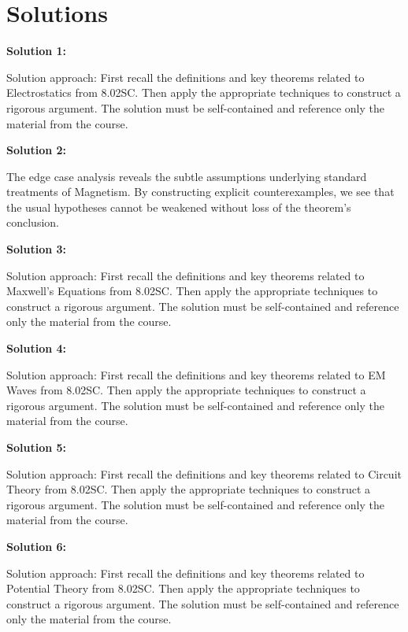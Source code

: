 \documentclass[12pt,a4paper]{exam}
\begin{document}
\newpage
\section*{Solutions}

\textbf{Solution 1:}

Solution approach: First recall the definitions and key theorems related to Electrostatics from 8.02SC. Then apply the appropriate techniques to construct a rigorous argument. The solution must be self-contained and reference only the material from the course.

\vspace{0.5cm}

\textbf{Solution 2:}

The edge case analysis reveals the subtle assumptions underlying standard treatments of Magnetism. By constructing explicit counterexamples, we see that the usual hypotheses cannot be weakened without loss of the theorem's conclusion.

\vspace{0.5cm}

\textbf{Solution 3:}

Solution approach: First recall the definitions and key theorems related to Maxwell's Equations from 8.02SC. Then apply the appropriate techniques to construct a rigorous argument. The solution must be self-contained and reference only the material from the course.

\vspace{0.5cm}

\textbf{Solution 4:}

Solution approach: First recall the definitions and key theorems related to EM Waves from 8.02SC. Then apply the appropriate techniques to construct a rigorous argument. The solution must be self-contained and reference only the material from the course.

\vspace{0.5cm}

\textbf{Solution 5:}

Solution approach: First recall the definitions and key theorems related to Circuit Theory from 8.02SC. Then apply the appropriate techniques to construct a rigorous argument. The solution must be self-contained and reference only the material from the course.

\vspace{0.5cm}

\textbf{Solution 6:}

Solution approach: First recall the definitions and key theorems related to Potential Theory from 8.02SC. Then apply the appropriate techniques to construct a rigorous argument. The solution must be self-contained and reference only the material from the course.
\end{document}
